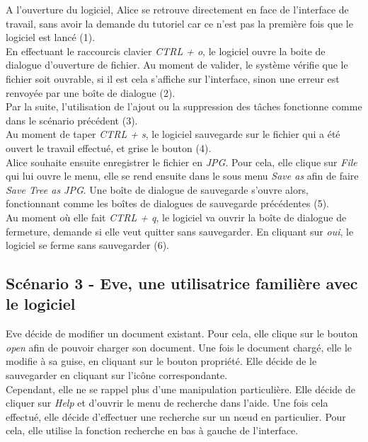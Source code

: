\documentclass[12pt, a4paper]{article}
\begin{document}
A l'ouverture du logiciel, Alice se retrouve directement en face de l'interface de travail, sans avoir la demande du tutoriel car ce n'est pas la première fois que le logiciel est lancé (1).\\


En effectuant le raccourcis clavier \emph{CTRL + o}, le logiciel ouvre la boite de dialogue d'ouverture de fichier. Au moment de valider, le système vérifie que le fichier soit ouvrable, si il est cela s'affiche sur l'interface, sinon une erreur est renvoyée par une boîte de dialogue (2).\\


Par la suite, l'utilisation de l'ajout ou la suppression des tâches fonctionne comme dans le scénario précédent (3).\\


Au moment de taper \emph{CTRL + s}, le logiciel sauvegarde sur le fichier qui a été ouvert le travail effectué, et grise le bouton (4). \\


Alice souhaite ensuite enregistrer le fichier en \emph{JPG}. Pour cela, elle clique sur \emph{File} qui lui ouvre le menu, elle se rend ensuite dans le sous menu \emph{Save as} afin de faire \emph{Save Tree as JPG}. Une boîte de dialogue de sauvegarde s'ouvre alors, fonctionnant comme les boîtes de dialogues de sauvegarde précédentes (5).\\


Au moment où elle fait \emph{CTRL + q}, le logiciel va ouvrir la boîte de dialogue de fermeture, demande si elle veut quitter sans sauvegarder. En cliquant sur \emph{oui}, le logiciel se ferme sans sauvegarder (6).\newpage


\subsection{Scénario 3 - Eve, une utilisatrice familière avec le logiciel}


Eve décide de modifier un document existant. Pour cela, elle clique sur le bouton \emph{open} afin de pouvoir charger son document. Une fois le document chargé, elle le modifie à sa guise, en cliquant sur le bouton propriété. Elle décide de le sauvegarder en cliquant sur l'icône correspondante.\\


Cependant, elle ne se rappel plus d'une manipulation particulière. Elle décide de cliquer sur \emph{Help} et d'ouvrir le menu de recherche dans l'aide. Une fois cela effectué, elle décide d’effectuer une recherche sur un nœud en particulier. Pour cela, elle utilise la fonction recherche en bas à gauche de l'interface. \\
\end{document}
